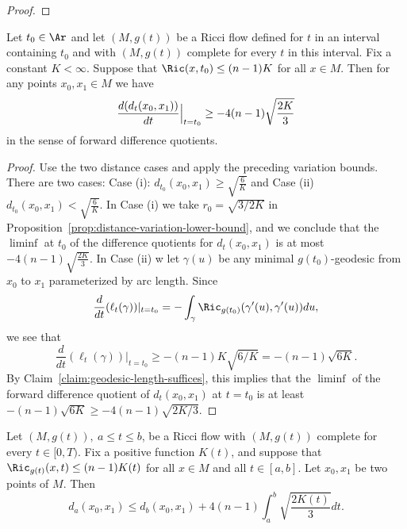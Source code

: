 \begin{proof}
\end{proof}

\begin{corollary}\label{cor:distance-variation-complete}
\label{2ndI.8.3}

Let $t_0\in \Ar$ and let $(M,g(t))$ be a Ricci flow defined for $t$ in an
interval
containing $t_0$ and with $(M,g(t))$ complete for every $t$ in this
interval. Fix a constant $K<\infty$. Suppose that $\Ric(x,t_0)\le (n-1)K$
for all $x\in M$.
 Then for any points $x_0,x_1\in M$ we have
$$\frac{d(d_t(x_0,x_1))}{dt}\Bigl|_{t=t_0}\Bigr.\ge -4(n-1)\sqrt{\frac{2K}{3}}$$
in the sense of forward difference quotients.
\end{corollary}

\begin{proof}
\sketch Use the two distance cases and apply the preceding variation bounds.
There are two cases: Case (i): $d_{t_0}(x_0,x_1)\ge
\sqrt{\frac{6}{K}}$ and Case (ii) $d_{t_0}(x_0,x_1)<
\sqrt{\frac{6}{K}}$. In Case (i) we  take $r_0=\sqrt{3/2K}$ in
Proposition~\ref{prop:distance-variation-lower-bound}, and we conclude that the $\liminf$ at
$t_0$ of the difference quotients for $d_{t}(x_0,x_1)$ is at most
$-4(n-1)\sqrt{\frac{2K}{3}}$. In Case (ii) w let $\gamma(u)$ be any
minimal $g(t_0)$-geodesic from $x_0$ to $x_1$ parameterized by arc
length. Since
$$\frac{d}{dt}(\ell_t(\gamma))|_{t=t_0}=-\int_\gamma
\Ric_{g(t_0)}(\gamma'(u),\gamma'(u))du,$$ we see that
$$\frac{d}{dt}(\ell_t(\gamma))|_{t=t_0}\ge
-(n-1)K\sqrt{6/K}=-(n-1)\sqrt{6K}.$$ By Claim~\ref{claim:geodesic-length-suffices}, this
implies that the $\liminf$ of the forward difference quotient of
$d_t(x_0,x_1)$ at $t=t_0$ is at least $-(n-1)\sqrt{6K}\ge
-4(n-1)\sqrt{2K/3}$.
\end{proof}



\begin{corollary}\label{cor:distance-integral-bound}
\label{corI.8.3}

 Let $(M,g(t)),\ a\le t\le b$, be a Ricci flow with $(M,g(t))$ complete for every $t
\in [0,T)$. Fix a positive function $K(t)$, and suppose that $\Ric_{g(t)}(x,t)\le (n-1)K(t)$ for all $x\in M$ and all $t\in [a,b]$. Let
$x_0,x_1$ be two points of $M$. Then
$$d_a(x_0,x_1)\le d_b(x_0,x_1)+4(n-1)\int_a^b\sqrt{\frac{2K(t)}{3}}dt.$$
\end{corollary}


